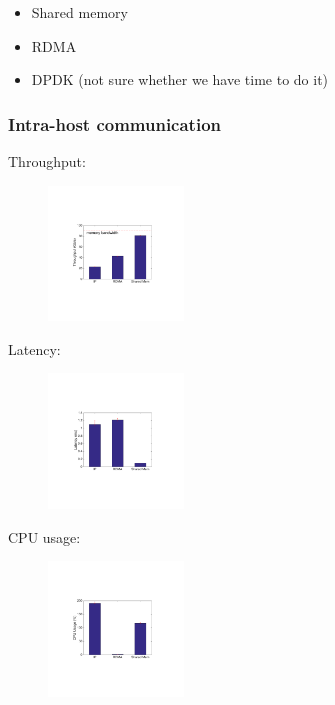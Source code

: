 \begin{itemize}
  \item Shared memory
  \item RDMA
  \item DPDK (not sure whether we have time to do it)
\end{itemize}

\subsubsection{Intra-host communication}

Throughput:
     \begin{figure}[ht]
     \centering 
     \includegraphics[width=0.32\textwidth]{figures/motivation/eval_baremetal_thr.pdf}      
     \label{fig:eval_baremetal_thr}
     \caption{} 
     \end{figure}

Latency:    
     \begin{figure}[ht]
     \centering 
     \includegraphics[width=0.32\textwidth]{figures/motivation/eval_baremetal_latency.pdf}      
     \label{fig:eval_baremetal_latency}
     \caption{} 
     \end{figure}

CPU usage:     
     \begin{figure}[ht]
     \centering 
     \includegraphics[width=0.32\textwidth]{figures/motivation/eval_baremetal_cpu.pdf}      
     \label{fig:eval_baremetal_cpu}
     \caption{} 
     \end{figure}
     
